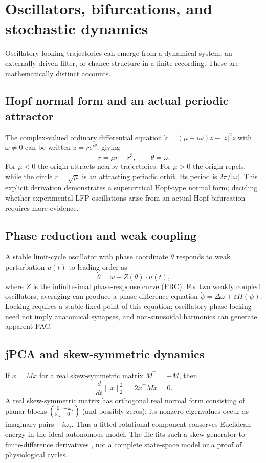 \chapter[Oscillators and stochastic dynamics]{Oscillators, bifurcations, and stochastic dynamics}
\label{ch:oscillator-foundations}
Oscillatory-looking trajectories can emerge from a dynamical
system, an externally driven filter, or chance structure in
a finite recording. These are mathematically distinct accounts.

\section{Hopf normal form and an actual periodic attractor}
The complex-valued ordinary differential equation
$\dot z=(\mu+i\omega)z-|z|^2z$ with $\omega\ne0$
can be written $z=re^{i\theta}$, giving
\[
\dot r=\mu r-r^3,\qquad \dot\theta=\omega.
\]
For $\mu<0$ the origin attracts nearby trajectories.
For $\mu>0$ the origin repels, while the circle
$r=\sqrt\mu$ is an attracting periodic orbit. Its period
is $2\pi/|\omega|$.
This explicit derivation demonstrates a supercritical Hopf-type
normal form; deciding whether experimental LFP oscillations
arise from an actual Hopf bifurcation requires more evidence.

\section{Phase reduction and weak coupling}
A stable limit-cycle oscillator with phase coordinate $\theta$
responds to weak perturbation $u(t)$ to leading order as
\[
\dot\theta=\omega+Z(\theta)\cdot u(t),
\]
where $Z$ is the infinitesimal phase-response curve (PRC).
For two weakly coupled oscillators, averaging can produce
a phase-difference equation
$\dot\psi=\Delta\omega+\varepsilon H(\psi)$.
Locking requires a stable fixed point of this equation;
oscillatory phase locking need not imply anatomical
synapses, and non-sinusoidal harmonics can generate apparent PAC.

\section{jPCA and skew-symmetric dynamics}
If $\dot x=Mx$ for a real skew-symmetric matrix
$M^\top=-M$, then
\[
\frac{d}{dt}\|x\|_2^2=2x^\top Mx=0.
\]
A real skew-symmetric matrix has orthogonal real normal form
consisting of planar blocks
$\begin{psmallmatrix}0&-\omega_j\\\omega_j&0\end{psmallmatrix}$
(and possibly zeros); its nonzero eigenvalues occur as
imaginary pairs $\pm i\omega_j$. Thus a fitted rotational
component conserves Euclidean energy in the ideal autonomous
model. The file 
fits such a skew generator to finite-difference derivatives
\cite{churchland2012},
not a complete state-space model or a proof of physiological cycles.

